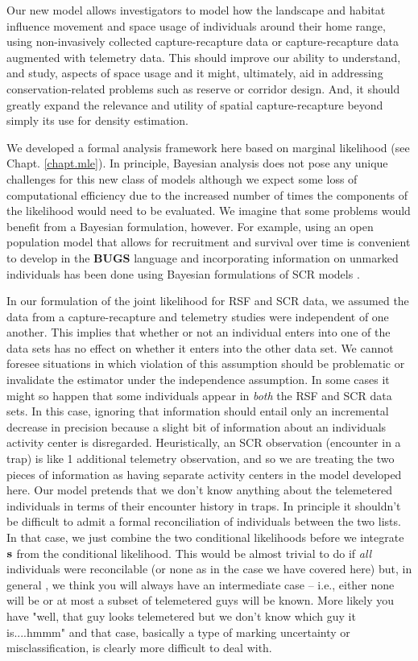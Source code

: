 Our new model allows investigators to model how the landscape and
habitat influence movement and space usage of individuals around their
home range, using non-invasively collected capture-recapture data or
capture-recapture data augmented with telemetry data.  This should
improve our ability to understand, and study, aspects of space usage
and it might, ultimately, aid in addressing conservation-related
problems such as reserve or corridor design. And, it should greatly
expand the relevance and utility of spatial capture-recapture beyond
simply its use for density estimation.

We developed a formal analysis framework here based on marginal
likelihood \citep{borchers_efford:2008} (see Chapt. \ref{chapt.mle}).
In principle, Bayesian analysis does not pose any unique challenges
for this new class of models although we expect some loss of
computational efficiency due to the increased number of times the
components of the likelihood would need to be evaluated.  We imagine
that some problems would benefit from a Bayesian formulation,
however. For example, using an open population model that allows for
recruitment and survival over time \citep{gardner_etal:2010} is
convenient to develop in the {\bf BUGS} language and incorporating
information on unmarked individuals has been done using Bayesian
formulations of SCR models \citep{chandler_royle:2012,
  sollmann_etal:2012}.

In our formulation of the joint likelihood for RSF and SCR data, we
assumed the data from a capture-recapture and telemetry studies were
independent of one another. This implies that whether or not an
individual enters into one of the data sets has no effect on whether
it enters into the other data set. We cannot foresee situations in
which violation of this assumption should be problematic or invalidate
the estimator under the independence assumption.  In some cases it
might so happen that some individuals appear in {\it both} the RSF and
SCR data sets. In this case, ignoring that information should entail
only an incremental decrease in precision because a slight bit of
information about an individuals activity center is
disregarded. Heuristically, an SCR observation (encounter in a trap)
is like 1 additional telemetry observation, and so we are treating the
two pieces of information as having separate activity centers in the
model developed here.  Our model pretends that we don't know anything
about the telemetered individuals in terms of their encounter history
in traps.  In principle it shouldn't be difficult to admit a formal
reconciliation of individuals between the two lists. In that case, we
just combine the two conditional likelihoods before we integrate ${\bf
  s}$ from the conditional likelihood. This would be almost trivial to
do if {\it all} individuals were reconcilable (or none as in the case
we have covered here) but, in general , we think you will always have
an intermediate case -- i.e., either none will be or at most a subset
of telemetered guys will be known. More likely you have "well, that
guy looks telemetered but we don't know which guy it is....hmmm" and
that case, basically a type of marking uncertainty or
misclassification, is clearly more difficult to deal with.


